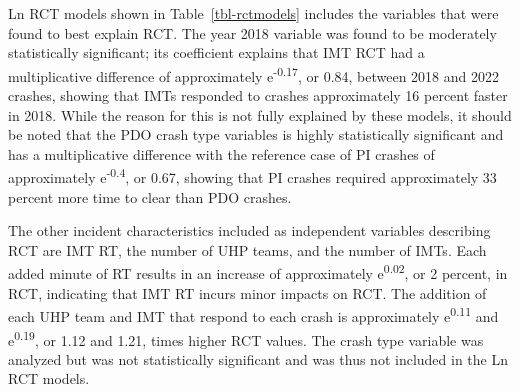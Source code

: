 \documentclass[
  letterpaper,
  authoryear]{elsarticle}
\begin{document}
Ln RCT models shown in Table~\ref{tbl-rctmodels} includes the variables
that were found to best explain RCT. The year 2018 variable was found to
be moderately statistically significant; its coefficient explains that
IMT RCT had a multiplicative difference of approximately
e\textsuperscript{-0.17}, or 0.84, between 2018 and 2022 crashes,
showing that IMTs responded to crashes approximately 16 percent faster
in 2018. While the reason for this is not fully explained by these
models, it should be noted that the PDO crash type variables is highly
statistically significant and has a multiplicative difference with the
reference case of PI crashes of approximately e\textsuperscript{-0.4},
or 0.67, showing that PI crashes required approximately 33 percent more
time to clear than PDO crashes.

The other incident characteristics included as independent variables
describing RCT are IMT RT, the number of UHP teams, and the number of
IMTs. Each added minute of RT results in an increase of approximately
e\textsuperscript{0.02}, or 2 percent, in RCT, indicating that IMT RT
incurs minor impacts on RCT. The addition of each UHP team and IMT that
respond to each crash is approximately e\textsuperscript{0.11} and
e\textsuperscript{0.19}, or 1.12 and 1.21, times higher RCT values. The
crash type variable was analyzed but was not statistically significant
and was thus not included in the Ln RCT models.
\end{document}
